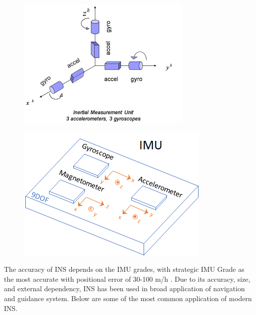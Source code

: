 \begin{figure}[!ht]
\centering
\begin{minipage}{.5\textwidth}
  \centering
  \includegraphics[height=0.7\linewidth]{Figures/imu_6dof.jpg}
  \label{fig:IMU6DOF}
\end{minipage}%
\begin{minipage}{.5\textwidth}
  \centering
  \includegraphics[height=0.7\linewidth]{Figures/imu_diagram.png}
  \label{fig:9DOFIMU}
\end{minipage}
\end{figure}


\noindent The accuracy of INS depends on the IMU grades, with strategic IMU Grade as the most accurate with positional error of 30-100 m/h \cite{El-Sheimy2020InertialTrends}. Due to its accuracy, size, and external dependency, INS has been used in broad application of navigation and guidance system. Below are some of the most common application of modern INS.

